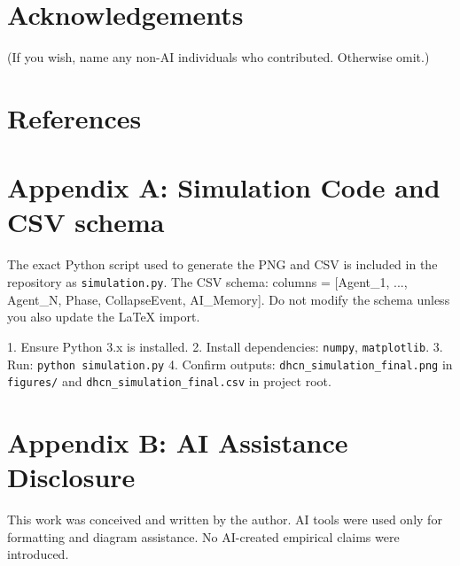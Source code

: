 \documentclass[12pt]{article}
\begin{document}
\section*{Acknowledgements}
(If you wish, name any non-AI individuals who contributed. Otherwise omit.)

\section*{References}



\appendix
\renewcommand{\thesection}{A.\arabic{section}}

\section{Appendix A: Simulation Code and CSV schema}
The exact Python script used to generate the PNG and CSV is included in the repository as \texttt{simulation.py}. The CSV schema: columns = [Agent\_1, ..., Agent\_N, Phase, CollapseEvent, AI\_Memory]. Do not modify the schema unless you also update the LaTeX import.

\begin{tcolorbox}[breakable,title=Running Instructions,colback=blue!5!white,colframe=blue!80!black]
1. Ensure Python 3.x is installed.  
2. Install dependencies: \texttt{numpy}, \texttt{matplotlib}.  
3. Run: \texttt{python simulation.py}  
4. Confirm outputs: \texttt{dhcn\_simulation\_final.png} in \texttt{figures/} and \texttt{dhcn\_simulation\_final.csv} in project root.
\end{tcolorbox}

\section{Appendix B: AI Assistance Disclosure}
This work was conceived and written by the author. AI tools were used only for formatting and diagram assistance. No AI-created empirical claims were introduced.
\end{document}
